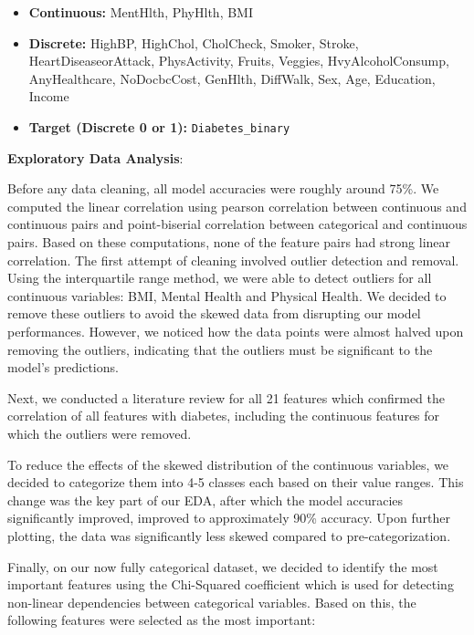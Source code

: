 \documentclass[conference]{IEEEtran}
\begin{document}
\begin{itemize}
  \item \textbf{Continuous:} MentHlth, PhyHlth, BMI
  \item \textbf{Discrete:} HighBP, HighChol, CholCheck, Smoker, Stroke, HeartDiseaseorAttack, PhysActivity, Fruits, Veggies, HvyAlcoholConsump, AnyHealthcare, NoDocbcCost, GenHlth, DiffWalk, Sex, Age, Education, Income
  \item \textbf{Target (Discrete 0 or 1):} \texttt{Diabetes\_binary}
\end{itemize}

\vspace{1em}

\noindent
\textbf{Exploratory Data Analysis}:

Before any data cleaning, all model accuracies were roughly around 75\%. 
We computed the linear correlation using pearson correlation between continuous and continuous pairs and point-biserial correlation between categorical and continuous pairs.  Based on these computations, none of the feature pairs had strong linear correlation.  
The first attempt of cleaning involved outlier detection and removal.  Using the interquartile range method, we were able to detect outliers for all continuous variables: BMI, Mental Health and Physical Health.  We decided to remove these outliers to avoid the skewed data from disrupting our model performances.  However, we noticed how the data points were almost halved upon removing the outliers, indicating that the outliers must be significant to the model’s predictions. 

Next, we conducted a literature review for all 21 features which confirmed the correlation of all features with diabetes, including the continuous features for which the outliers were removed.  

To reduce the effects of the skewed distribution of the continuous variables, we decided to categorize them into 4-5 classes each based on their value ranges.  This change was the key part of our EDA, after which the model accuracies significantly improved, improved to approximately 90\% accuracy.  Upon further plotting, the data was significantly less skewed compared to pre-categorization.

Finally, on our now fully categorical dataset, we decided to identify the most important features using the Chi-Squared coefficient which is used for detecting non-linear dependencies between categorical variables. Based on this, the following features were selected as the most important:  
\end{document}
